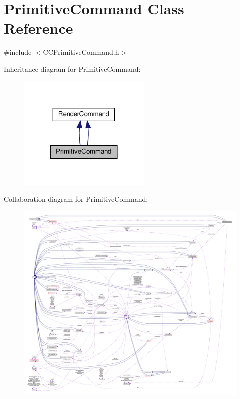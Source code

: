 \hypertarget{classPrimitiveCommand}{}\section{Primitive\+Command Class Reference}
\label{classPrimitiveCommand}


{\ttfamily \#include $<$C\+C\+Primitive\+Command.\+h$>$}



Inheritance diagram for Primitive\+Command\+:
\nopagebreak
\begin{figure}[H]
\begin{center}
\leavevmode
\includegraphics[width=180pt]{classPrimitiveCommand__inherit__graph}
\end{center}
\end{figure}


Collaboration diagram for Primitive\+Command\+:
\nopagebreak
\begin{figure}[H]
\begin{center}
\leavevmode
\includegraphics[width=350pt]{classPrimitiveCommand__coll__graph}
\end{center}
\end{figure}
